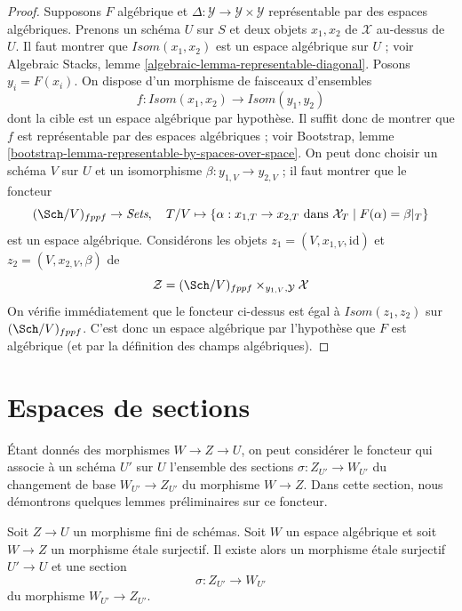 \begin{proof}
Supposons $F$ algébrique et
$\Delta : \mathcal{Y} \to \mathcal{Y} \times \mathcal{Y}$
représentable par des espaces algébriques.
Prenons un schéma $U$ sur $S$ et deux objets $x_1, x_2$ de
$\mathcal{X}$ au-dessus de $U$.
Il faut montrer que $\mathit{Isom}(x_1, x_2)$ est un espace algébrique
sur $U$ ; voir
Algebraic Stacks, lemme \ref{algebraic-lemma-representable-diagonal}.
Posons $y_i = F(x_i)$. On dispose d'un morphisme de faisceaux d'ensembles
$$
f : \mathit{Isom}(x_1, x_2) \to \mathit{Isom}(y_1, y_2)
$$
dont la cible est un espace algébrique par hypothèse.
Il suffit donc de montrer que $f$ est représentable par des
espaces algébriques ; voir Bootstrap, lemme
\ref{bootstrap-lemma-representable-by-spaces-over-space}.
On peut donc choisir un schéma $V$ sur $U$ et un
isomorphisme $\beta : y_{1, V} \to y_{2, V}$ ;
il faut montrer que le foncteur
$$
(\Sch/V)_{fppf} \to \textit{Sets},\quad
T/V \mapsto \{\alpha : x_{1, T} \to x_{2, T}
\text{ dans }\mathcal{X}_T \mid F(\alpha) = \beta|_T\}
$$
est un espace algébrique. Considérons les objets
$z_1 = (V, x_{1, V}, \text{id})$ et
$z_2 = (V, x_{2, V}, \beta)$ de
$$
\mathcal{Z} = (\Sch/V)_{fppf} \times_{y_{1, V}, \mathcal{Y}} \mathcal{X}
$$
On vérifie immédiatement que
le foncteur ci-dessus est égal à $\mathit{Isom}(z_1, z_2)$
sur $(\Sch/V)_{fppf}$. C'est donc un espace algébrique
par l'hypothèse que $F$ est algébrique (et par la définition
des champs algébriques).
\end{proof}
















\section{Espaces de sections}
\label{section-spaces-sections}

\noindent
Étant donnés des morphismes $W \to Z \to U$, on peut considérer le foncteur qui associe
à un schéma $U'$ sur $U$ l'ensemble des sections $\sigma : Z_{U'} \to W_{U'}$
du changement de base $W_{U'} \to Z_{U'}$ du morphisme $W \to Z$.
Dans cette section, nous démontrons quelques lemmes préliminaires sur ce foncteur.

\begin{lemma}
\label{lemma-surjection-space-of-sections}
Soit $Z \to U$ un morphisme fini de schémas.
Soit $W$ un espace algébrique et soit $W \to Z$ un
morphisme étale surjectif. Il existe alors un morphisme
étale surjectif $U' \to U$ et une section
$$
\sigma : Z_{U'} \to W_{U'}
$$
du morphisme $W_{U'} \to Z_{U'}$.
\end{lemma}

